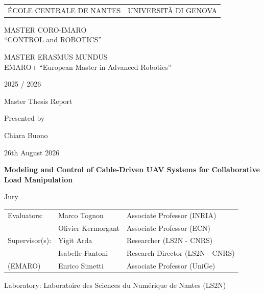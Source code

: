 \thispagestyle{empty}

\def\lskip{\vspace{0.5cm}}

\noindent
\begin{tabularx}{\textwidth}{@{} X >{\raggedleft\arraybackslash}X @{}}
ÉCOLE CENTRALE DE NANTES & UNIVERSITÀ DI GENOVA
\end{tabularx}

\vspace{2cm}

\begin{center} 
    \large\sc MASTER CORO-IMARO\\ 
    \normalsize{``CONTROL and ROBOTICS''} 
\end{center}

\begin{center} 
    \large\sc MASTER ERASMUS MUNDUS \\ 
    \normalsize{EMARO+ ``European Master in Advanced Robotics''} 
\end{center}

\begin{center}
    2025 / 2026\lskip
    
    Master Thesis Report\lskip
    
    Presented by\lskip 
    
    Chiara Buono\lskip
    
    26th August 2026\lskip\lskip
    
    {\Large \textbf{Modeling and Control of Cable-Driven UAV Systems for Collaborative Load Manipulation}}
    
    \vfill

    Jury\lskip
\end{center}

\noindent
\begin{tabularx}{\textwidth}{@{} l l X @{}}
Evaluators:     & Marco Tognon        & Associate Professor (INRIA) \\
                & Olivier Kermorgant  & Associate Professor (ECN) \\ 
Supervisor(s):  & Yigit Arda          & Researcher (LS2N - CNRS) \\
                & Isabelle Fantoni    & Research Director (LS2N - CNRS) \\
(EMARO)         & Enrico Simetti      & Associate Professor (UniGe)
\end{tabularx}

\lskip

\begin{flushleft}
 Laboratory: Laboratoire des Sciences du Numérique de Nantes (LS2N)
\end{flushleft}

\newpage
\thispagestyle{empty}
\null
\newpage
\addtocounter{page}{-1}
\pagestyle{fancy}